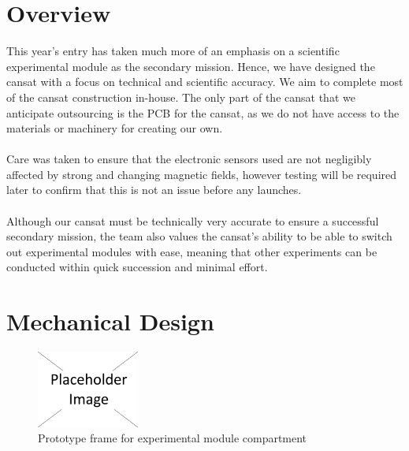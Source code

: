 \documentclass{report}
\begin{document}
	\section{Overview}
		This year’s entry has taken much more of an emphasis on a scientific
		experimental module as the secondary mission. Hence, we have designed 
		the cansat with a focus on technical and scientific accuracy. We aim to
		complete most of the cansat construction in-house. The only part of the
		cansat that we anticipate outsourcing is the PCB for the cansat, as we do
		not have access to the materials or machinery for creating our own.
		\\\\
		Care was taken to ensure that the electronic sensors used are not 
		negligibly affected by strong and changing magnetic fields, however 
		testing will be required later to confirm that this is not an issue before 
		any launches.
		\\\\
		{\color{blue}Although our cansat must be technically very accurate to ensure
		a successful secondary mission, the team also values the cansat's ability
		to be able to switch out experimental modules with ease, meaning that
		other experiments can be conducted within quick succession and minimal
		effort.}

	\section{Mechanical Design}

		\begin{figure}
			\vspace{-47pt}
	 		\begin{center}
			\includegraphics[width=0.30\textwidth]{placeholder}
			\end{center}
			\vspace{-15pt}
			\caption[X]{Prototype frame for experimental module compartment}
		\end{figure}
\end{document}
